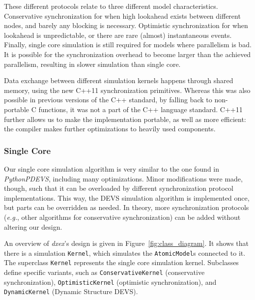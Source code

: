 These different protocols relate to three different model characteristics.
Conservative synchronization for when high lookahead exists between different nodes, and barely any blocking is necessary.
Optimistic synchronization for when lookahead is unpredictable, or there are rare (almost) instantaneous events.
Finally, single core simulation is still required for models where parallelism is bad. 
It is possible for the synchronization overhead to become larger than the achieved parallelism, resulting in slower simulation than single core.

Data exchange between different simulation kernels happens through shared memory, using the new C++11 synchronization primitives.
Whereas this was also possible in previous versions of the C++ standard, by falling back to non-portable C functions, it was not a part of the C++ language standard.
C++11 further allows us to make the implementation portable, as well as more efficient: the compiler makes further optimizations to heavily used components.

\subsubsection{Single Core}
Our single core simulation algorithm is very similar to the one found in \textit{PythonPDEVS}, including many optimizations.
Minor modifications were made, though, such that it can be overloaded by different synchronization protocol implementations.
This way, the \textsf{DEVS} simulation algorithm is implemented once, but parts can be overridden as needed.
In theory, more synchronization protocols (\textit{e.g.}, other algorithms for conservative synchronization) can be added without altering our design.

An overview of \textit{dxex}'s design is given in Figure~\ref{fig:class_diagram}.
It shows that there is a simulation \texttt{Kernel}, which simulates the \texttt{AtomicModel}s connected to it.
The superclass \texttt{Kernel} represents the single core simulation kernel.
Subclasses define specific variants, such as \texttt{ConservativeKernel} (conservative synchronization), \texttt{OptimisticKernel} (optimistic synchronization), and \texttt{DynamicKernel} (\textsf{Dynamic Structure DEVS}).

